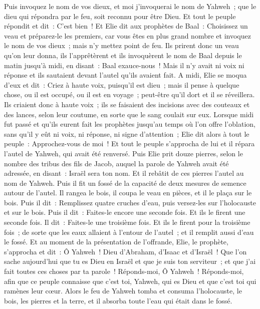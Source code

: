 \begin{multicols}{2}
Puis invoquez le nom de vos dieux, et moi j'invoquerai le nom de Yahweh~; que le dieu qui répondra par le feu, soit reconnu pour être Dieu. Et tout le peuple répondit et dit~: C'est bien~!
Et Elie dit aux prophètes de Baal~: Choisissez un veau et préparez-le les premiers, car vous êtes en plus grand nombre et invoquez le nom de vos dieux~; mais n'y mettez point de feu.
Ils prirent donc un veau qu'on leur donna, ils l'apprêtèrent et ils invoquèrent le nom de Baal depuis le matin jusqu'à midi, en disant~: Baal exauce-nous~! Mais il n'y avait ni voix ni réponse et ils sautaient devant l'autel qu'ils avaient fait.
A midi, Elie se moqua d'eux et dit~: Criez à haute voix, puisqu'il est dieu~; mais il pense à quelque chose, ou il est occupé, ou il est en voyage~; peut-être qu'il dort et il se réveillera.
Ils criaient donc à haute voix~; ils se faisaient des incisions avec des couteaux et des lances, selon leur coutume, en sorte que le sang coulait sur eux.
Lorsque midi fut passé et qu'ils eurent fait les prophètes jusqu'au temps où l'on offre l'oblation, sans qu'il y eût ni voix, ni réponse, ni signe d'attention~;
Elie dit alors à tout le peuple~: Approchez-vous de moi~! Et tout le peuple s'approcha de lui et il répara l'autel de Yahweh, qui avait été renversé.
Puis Elie prit douze pierres, selon le nombre des tribus des fils de Jacob, auquel la parole de Yahweh avait été adressée, en disant~: Israël sera ton nom.
Et il rebâtit de ces pierres l'autel au nom de Yahweh. Puis il fit un fossé de la capacité de deux mesures de semence autour de l'autel.
Il rangea le bois, il coupa le veau en pièces, et il le plaça sur le bois.
Puis il dit~: Remplissez quatre cruches d'eau, puis versez-les sur l'holocauste et sur le bois. Puis il dit~: Faites-le encore une seconde fois. Et ils le firent une seconde fois. Il dit~: Faites-le une troisième fois. Et ils le firent pour la troisième fois~;
de sorte que les eaux allaient à l'entour de l'autel~; et il remplit aussi d'eau le fossé.
Et au moment de la présentation de l'offrande, Elie, le prophète, s'approcha et dit~: Ô Yahweh~! Dieu d'Abraham, d'Isaac et d'Israël~! Que l'on sache aujourd'hui que tu es Dieu en Israël et que je suis ton serviteur~; et que j'ai fait toutes ces choses par ta parole~!
Réponds-moi, Ô Yahweh~! Réponds-moi, afin que ce peuple connaisse que c'est toi, Yahweh, qui es Dieu et que c'est toi qui ramènes leur cœur.
Alors le feu de Yahweh tomba et consuma l'holocauste, le bois, les pierres et la terre, et il absorba toute l'eau qui était dans le fossé.

\end{multicols}
